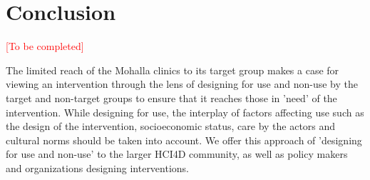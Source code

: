 \documentclass{sigchi}
\begin{document}








\section{Conclusion}
\textcolor{red}{[To be completed]}

The limited reach of the Mohalla clinics to its target group makes a case for viewing an intervention through the lens of designing for use and non-use by the target and non-target groups to ensure that it reaches those in 'need' of the intervention. While designing for use, the interplay of factors affecting use such as the design of the intervention, socioeconomic status, care by the actors and cultural norms should be taken into account. We offer this approach of 'designing for use and non-use' to the larger HCI4D community, as well as policy makers and organizations designing interventions.
\balance



\end{document}
